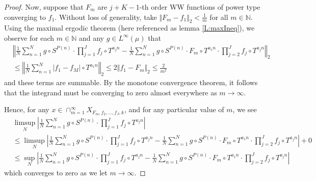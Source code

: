 \documentclass[10pt,a4paper]{amsart}
\newcommand{\N}{\mathbb{N}}
\begin{document}
\begin{proof}
Now, suppose that $F_m$ are $j+K-1$-th order WW functions of power type converging to $f_1$. Without loss of generality, take $\Vert F_m - f_1 \Vert_2< \frac{1}{m}$ for all $m\in \N$. Using the maximal ergodic theorem (here referenced as lemma \ref{L:maxIneq}), we observe for each $m\in \N$ and any $g \in L^\infty(\mu)$ that
\begin{align*}
&\left\Vert \frac{1}{N}\sum_{n=1}^N g\circ S^{P(n)} \cdot \prod_{j=1}^J f_j\circ T^{a_j n} - \frac{1}{N}\sum_{n=1}^N g\circ S^{P(n)} \cdot F_m \circ T^{a_1n} \cdot \prod_{j=2}^J f_j\circ T^{a_j n} \right\Vert_2 \\
&\leq \left\Vert \frac{1}{N}\sum_{n=1}^N \left| f_1 - f_M \right| \circ T^{a_1 n}  \right\Vert_2 \leq 2\Vert f_1 - F_m \Vert_2 \leq \frac{2}{m^2}
\end{align*}
and these terms are summable. By the monotone convergence theorem, it follows that the integrand must be converging to zero almost everywhere as $m\to \infty$.

Hence, for any $x\in \cap_{m=1}^\infty X_{F_m, f_2, \dots, f_J, k}$, and for any particular value of $m$, we see
\begin{align*}
&\limsup_N \left| \frac{1}{N}\sum_{n=1}^N g\circ S^{P(n)} \cdot \prod_{j=1}^J f_j\circ T^{a_j n}\right| \\
&\leq \limsup_N \left| \frac{1}{N}\sum_{n=1}^N g\circ S^{P(n)} \cdot \prod_{j=1}^J f_j\circ T^{a_j n} - \frac{1}{N}\sum_{n=1}^N g\circ S^{P(n)} \cdot F_m \circ T^{a_1n} \cdot \prod_{j=2}^J f_j\circ T^{a_j n} \right| + 0 \\
&\leq \sup_N \left| \frac{1}{N}\sum_{n=1}^N g\circ S^{P(n)} \cdot \prod_{j=1}^J f_j\circ T^{a_j n} - \frac{1}{N}\sum_{n=1}^N g\circ S^{P(n)} \cdot F_m \circ T^{a_1n} \cdot \prod_{j=2}^J f_j\circ T^{a_j n} \right| 
\end{align*}
which converges to zero as we let $m\to \infty$.
\end{proof}
\end{document}
